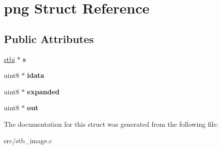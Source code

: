 \hypertarget{structpng}{}\section{png Struct Reference}
\label{structpng}
\subsection*{Public Attributes}
\begin{DoxyCompactItemize}
\item 
\hypertarget{structpng_a77d3bfd0ae8f598a475317ed39e78fd0}{}\hyperlink{structstbi}{stbi} $\ast$ {\bfseries s}\label{structpng_a77d3bfd0ae8f598a475317ed39e78fd0}

\item 
\hypertarget{structpng_a5cd944fdf0f0417a344bcc538ed98ed6}{}uint8 $\ast$ {\bfseries idata}\label{structpng_a5cd944fdf0f0417a344bcc538ed98ed6}

\item 
\hypertarget{structpng_a474dd0da8ac0347924e68f5de7e68c55}{}uint8 $\ast$ {\bfseries expanded}\label{structpng_a474dd0da8ac0347924e68f5de7e68c55}

\item 
\hypertarget{structpng_ada33c39620ad9a647c088c40d21887f6}{}uint8 $\ast$ {\bfseries out}\label{structpng_ada33c39620ad9a647c088c40d21887f6}

\end{DoxyCompactItemize}


The documentation for this struct was generated from the following file\+:\begin{DoxyCompactItemize}
\item 
src/stb\+\_\+image.\+c\end{DoxyCompactItemize}

